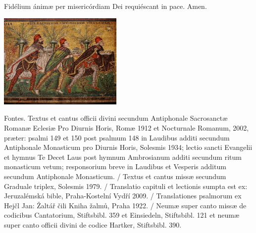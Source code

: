 \documentclass[a4paper, twoside, 12pt]{article}
\begin{document}
\vfill
\pagebreak


\trOrationis

\vfill


\vfill

\noindent \Vbardot{} Fidélium ánimæ per misericórdiam Dei requiéscant in pace.
\Rbardot{} Amen.

\trFideliumAnimae

\vfill

\newpage
\RemoveSideThumbs
\pagestyle{empty}



\vfill

\newpage

\begin{center}
\includegraphics[width=6cm]{imagines/ravenna.jpg}
\end{center}

\vfill

Fontes.
Textus et cantus officii divini secundum
Antiphonale Sacrosanctæ Romanæ Eclesiæ Pro Diurnis Horis, Romæ 1912
et Nocturnale Romanum, 2002, præter: psalmi 149 et 150 post
psalmum 148 in Laudibus additi secundum Antiphonale Monasticum pro Diurnis Horis,
Solesmis 1934; lectio sancti Evangelii et hymnus Te Decet Laus post hymnum
Ambrosianum additi secundum ritum monasticum vetum; responsorium breve
in Laudibus et Vesperis additum secundum Antiphonale Monasticum. /
Textus et cantus missæ secundum
Graduale triplex, Solesmis 1979. /
Translatio capituli et lectionis sumpta est ex:
Jeruzalémská bible, Praha-Kostelní Vydří 2009. /
Translationes psalmorum ex
Hejčl Jan: Žaltář čili Kniha žalmů, Praha 1922. /
Neumæ super canto missæ de codicibus Cantatorium, Stiftsbibl. 359 et Einsiedeln,
Stiftsbibl. 121 et neumæ super canto officii divini de codice Hartker,
Stiftsbibl. 390.
\end{document}

